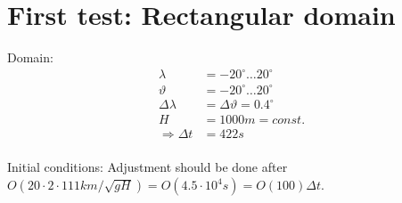 \documentclass[a4paper]{article}
\begin{document}

\section{First test: Rectangular domain}
Domain:
\begin{equation}
  \begin{split}
    \lambda & = -20^\circ \ldots 20^\circ \\
    \vartheta & = -20^\circ \ldots 20^\circ \\
    \Delta \lambda & = \Delta \vartheta = 0.4^\circ \\
    H & = 1000m = const. \\
    \Rightarrow \Delta t & = 422 s \\
  \end{split}
\end{equation}

Initial conditions:
Adjustment should be done after $O(20 \cdot 2 \cdot 111km / \sqrt{gH}) = 
O(4.5\cdot 10^4s) = O(100) \Delta t$.


%
%
\end{document}
